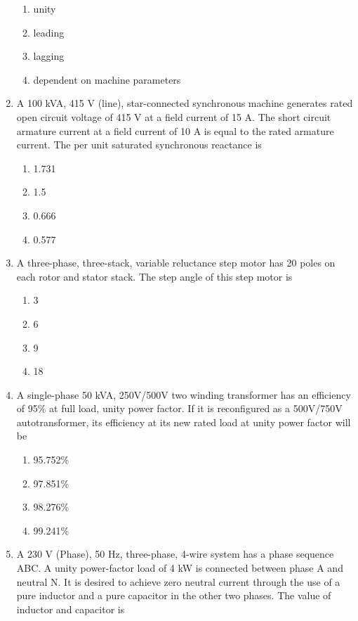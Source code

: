 \documentclass[journal]{IEEEtran}
\begin{document}
\begin{enumerate}
\begin{enumerate}
    \item unity
    \item leading
    \item lagging
    \item dependent on machine parameters \\
\end{enumerate}
\item A 100 kVA, 415 V (line), star-connected synchronous machine generates rated open circuit voltage of 415 V at a field current of 15 A. The short circuit armature current at a field current of 10 A is equal to the rated armature current. The per unit saturated synchronous reactance is
\begin{enumerate}
    \item 1.731
    \item 1.5
    \item 0.666
    \item 0.577 \\
\end{enumerate}
\item A three-phase, three-stack, variable reluctance step motor has 20 poles on each rotor and stator stack. The step angle of this step motor is
\begin{enumerate}
    \item 3\degree
    \item 6\degree
    \item 9\degree
    \item 18\degree \\
\end{enumerate}
\item A single-phase 50 kVA, 250V/500V two winding transformer has an efficiency of 95\% at full load, unity power factor. If it is reconfigured as a 500V/750V autotransformer, its efficiency at its new rated load at unity power factor will be
\begin{enumerate}
   \item 95.752\%
   \item 97.851\%
   \item 98.276\%
   \item 99.241\% \\
\end{enumerate}
\item A 230 V (Phase), 50 Hz, three-phase, 4-wire system has a phase sequence ABC. A unity power-factor load of 4 kW is connected between phase A and neutral N. It is desired to achieve zero neutral current through the use of a pure inductor and a pure capacitor in the other two phases. The value of inductor and capacitor is

\end{enumerate}
\end{document}
